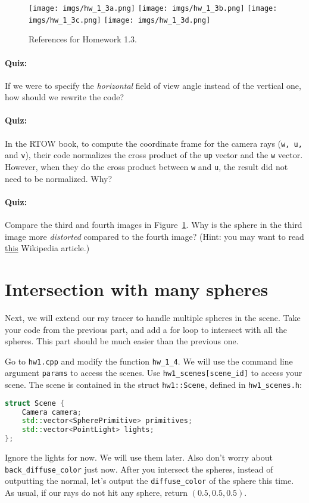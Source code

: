 \begin{figure}[ht]
    \centering
    \texttt{[image: imgs/hw\_1\_3a.png]}
    \texttt{[image: imgs/hw\_1\_3b.png]}
    \texttt{[image: imgs/hw\_1\_3c.png]}
    \texttt{[image: imgs/hw\_1\_3d.png]}
    \caption{References for Homework 1.3.}
    \label{fig:hw_1_3}
\end{figure}

\paragraph{Quiz:} If we were to specify the \emph{horizontal} field of view angle instead of the vertical one, how should we rewrite the code?

\paragraph{Quiz:} In the RTOW book, to compute the coordinate frame for the camera rays (\lstinline{w, u,} and \lstinline{v}), their code normalizes the cross product of the \lstinline{up} vector and the \lstinline{w} vector. However, when they do the cross product between \lstinline{w} and \lstinline{u}, the result did not need to be normalized. Why?

\paragraph{Quiz:} Compare the third and fourth images in Figure~\ref{fig:hw_1_3}. Why is the sphere in the third image more \emph{distorted} compared to the fourth image? (Hint: you may want to read \href{https://en.wikipedia.org/wiki/Perspective_distortion}{this} Wikipedia article.)

\section{Intersection with many spheres}
Next, we will extend our ray tracer to handle multiple spheres in the scene. Take your code from the previous part, and add a for loop to intersect with all the spheres. This part should be much easier than the previous one. 

Go to \lstinline{hw1.cpp} and modify the function \lstinline{hw_1_4}. We will use the command line argument \lstinline{params} to access the scenes. Use \lstinline{hw1_scenes[scene_id]} to access your scene. The scene is contained in the struct \lstinline{hw1::Scene}, defined in \lstinline{hw1_scenes.h}:
\begin{lstlisting}[language=C++]
struct Scene {
    Camera camera;
    std::vector<SpherePrimitive> primitives;
    std::vector<PointLight> lights; 
};
\end{lstlisting}
Ignore the lights for now. We will use them later. Also don't worry about \lstinline{back_diffuse_color} just now.
After you intersect the spheres, instead of outputting the normal, let's output the \lstinline{diffuse_color} of the sphere this time. As usual, if our rays do not hit any sphere, return $(0.5, 0.5, 0.5)$.

